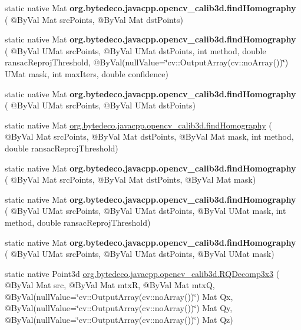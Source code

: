 \begin{DoxyCompactItemize}
static native Mat {\bfseries org.\+bytedeco.\+javacpp.\+opencv\+\_\+calib3d.\+find\+Homography} ( @By\+Val Mat src\+Points, @By\+Val Mat dst\+Points)
\item 
\mbox{\label{group__calib3d_ga02c22f3aa789333bb2146197cf762086}} 
static native Mat {\bfseries org.\+bytedeco.\+javacpp.\+opencv\+\_\+calib3d.\+find\+Homography} ( @By\+Val U\+Mat src\+Points, @By\+Val U\+Mat dst\+Points, int method, double ransac\+Reproj\+Threshold, @By\+Val(null\+Value=\char`\"{}cv\+::\+Output\+Array(cv\+::no\+Array())\char`\"{}) U\+Mat mask, int max\+Iters, double confidence)
\item 
\mbox{\label{group__calib3d_ga272bad10a2725fccd0a6da0d7dcb9950}} 
static native Mat {\bfseries org.\+bytedeco.\+javacpp.\+opencv\+\_\+calib3d.\+find\+Homography} ( @By\+Val U\+Mat src\+Points, @By\+Val U\+Mat dst\+Points)
\item 
static native Mat \hyperlink{group__calib3d_ga7460fd1ec11b17261dc7b2208a1f2d9f}{org.\+bytedeco.\+javacpp.\+opencv\+\_\+calib3d.\+find\+Homography} ( @By\+Val Mat src\+Points, @By\+Val Mat dst\+Points, @By\+Val Mat mask, int method, double ransac\+Reproj\+Threshold)
\item 
\mbox{\label{group__calib3d_ga226000eebca4a454da4349e21048e8ca}} 
static native Mat {\bfseries org.\+bytedeco.\+javacpp.\+opencv\+\_\+calib3d.\+find\+Homography} ( @By\+Val Mat src\+Points, @By\+Val Mat dst\+Points, @By\+Val Mat mask)
\item 
\mbox{\label{group__calib3d_ga8f27ec38a75fa0ce26429c059856a680}} 
static native Mat {\bfseries org.\+bytedeco.\+javacpp.\+opencv\+\_\+calib3d.\+find\+Homography} ( @By\+Val U\+Mat src\+Points, @By\+Val U\+Mat dst\+Points, @By\+Val U\+Mat mask, int method, double ransac\+Reproj\+Threshold)
\item 
\mbox{\label{group__calib3d_gaf8665bcdc74d73759d6e3666d96394af}} 
static native Mat {\bfseries org.\+bytedeco.\+javacpp.\+opencv\+\_\+calib3d.\+find\+Homography} ( @By\+Val U\+Mat src\+Points, @By\+Val U\+Mat dst\+Points, @By\+Val U\+Mat mask)
\item 
static native Point3d \hyperlink{group__calib3d_ga34838b4072f5a8e1eb0dc619c7ac8261}{org.\+bytedeco.\+javacpp.\+opencv\+\_\+calib3d.\+R\+Q\+Decomp3x3} ( @By\+Val Mat src, @By\+Val Mat mtxR, @By\+Val Mat mtxQ, @By\+Val(null\+Value=\char`\"{}cv\+::\+Output\+Array(cv\+::no\+Array())\char`\"{}) Mat Qx, @By\+Val(null\+Value=\char`\"{}cv\+::\+Output\+Array(cv\+::no\+Array())\char`\"{}) Mat Qy, @By\+Val(null\+Value=\char`\"{}cv\+::\+Output\+Array(cv\+::no\+Array())\char`\"{}) Mat Qz)

\end{DoxyCompactItemize}
